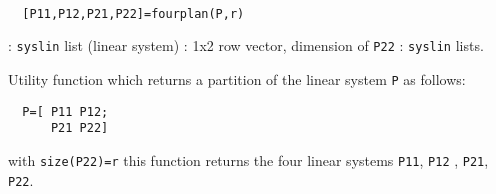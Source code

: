 \begin{mandesc}
   \\ %
\end{mandesc}
\begin{calling_sequence}
\begin{verbatim}
  [P11,P12,P21,P22]=fourplan(P,r)  
\end{verbatim}
\end{calling_sequence}
\begin{parameters}
  \begin{varlist}
    : \verb!syslin! list (linear system)
    : 1x2 row vector, dimension of \verb!P22!
    : \verb!syslin! lists.
  \end{varlist}
\end{parameters}
\begin{mandescription}
  Utility function which returns a partition of the linear system \verb!P! as follows:
\begin{verbatim}
  P=[ P11 P12;
      P21 P22]  
\end{verbatim}
  with \verb!size(P22)=r! this function returns the four linear systems \verb!P11!, \verb!P12!
  , \verb!P21!, \verb!P22!.
\end{mandescription}
\begin{manseealso}
        
\end{manseealso}
